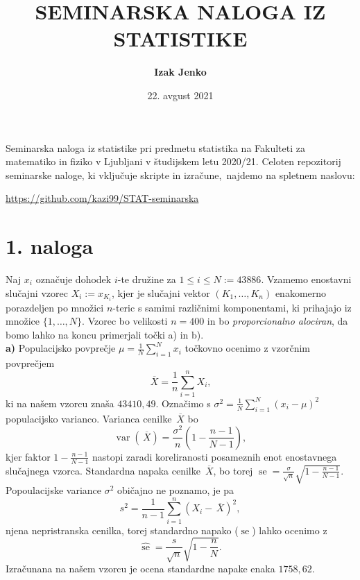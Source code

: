\documentclass[a4paper,11pt]{article}
\newcommand{\olsi}[1]{\,\overline{\!{#1}}} %
\newcommand{\sumin}{\sum_{i = 1}^n}
\renewcommand{\var}[1]{\operatorname{var}(#1)}
\DeclareMathOperator{\se}{se}
\begin{document}
    
\author{\Large{\textbf{Izak Jenko}}}
\title{SEMINARSKA NALOGA IZ STATISTIKE}
\date{22. avgust 2021}

\maketitle
\thispagestyle{empty}

\par
Seminarska naloga iz statistike pri predmetu statistika na Fakulteti za matematiko in fiziko v Ljubljani v študijskem letu 2020/21. Celoten repozitorij seminarske naloge, ki vključuje skripte in izračune, najdemo na spletnem naslovu:
\begin{center}
    \url{https://github.com/kazi99/STAT-seminarska} 
\end{center}

\section*{1. naloga}

Naj $x_i$ označuje dohodek $i$-te družine za $1 \leq i \leq N := 43 886$. Vzamemo enostavni slučajni vzorec $X_i := x_{K_i}$, kjer je slučajni vektor $(K_1, \ldots, K_n)$ enakomerno porazdeljen po množici $n$-teric s samimi različnimi komponentami, ki prihajajo iz množice $\{ 1, \dots, N\}$. Vzorec bo velikosti $n = 400$ in bo \emph{proporcionalno alociran}, da bomo lahko na koncu primerjali točki a) in b).
\\

\noindent
\textbf{a)} Populacijsko povprečje $\mu = \frac1N \sum_{i=1}^N x_i$ točkovno ocenimo z vzorčnim povprečjem
\[
    \olsi{X} = \frac1n \sum_{i = 1}^n X_i,  
\]
ki na našem vzorcu znaša $43410,49$. Označimo s $\sigma^2 = \frac{1}{N}\sum_{i = 1}^N (x_i - \mu)^2$ populacijsko varianco. Varianca cenilke $\olsi{X}$ bo 
\[
    \var{\olsi{X}} = \frac{\sigma^2}{n}\left(1 - \frac{n-1}{N-1}\right),
\]
kjer faktor $1 - \frac{n-1}{N-1}$ nastopi zaradi koreliranosti posameznih enot enostavnega slučajnega vzorca. Standardna napaka cenilke $\olsi{X}$, bo torej $\se = \frac{\sigma}{\sqrt{n}} \sqrt{1 - \frac{n-1}{N-1}}$. Popoulacijske variance $\sigma^2$ običajno ne poznamo, je pa 
\[
    s^2 = \frac{1}{n-1}\sumin(X_i - \olsi{X})^2, 
\]
njena nepristranska cenilka, torej standardno napako ($\se$) lahko ocenimo z
\[
    \hat{\se} = \frac{s}{\sqrt{n}}\sqrt{1 - \frac{n}{N}}.
\]
Izračunana na našem vzorcu je ocena standardne napake enaka $1758,62$.
\end{document}
